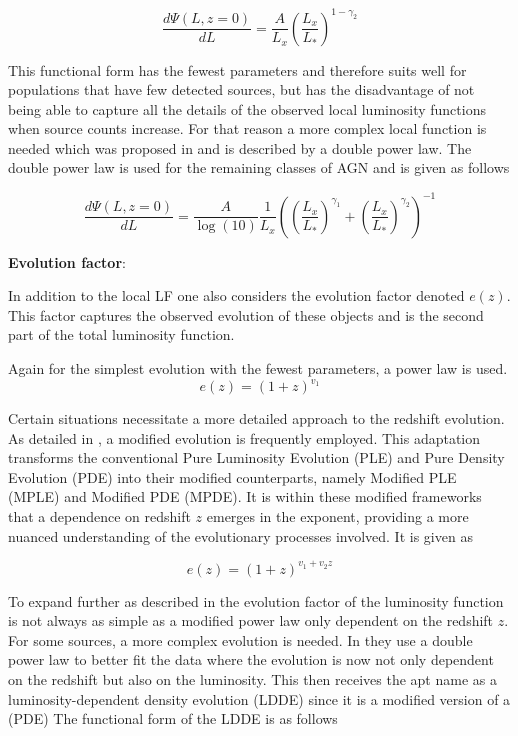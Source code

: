 \begin{equation}
    \frac{d\Psi(L,z=0)}{dL} = \frac{A}{L_x} \left( \frac{L_x}{L_*}\right)^{1-\gamma_2}
\end{equation}

This functional form has the fewest parameters and therefore suits well for populations that have few detected sources, but has the disadvantage of not being able to capture all the details of the observed local luminosity functions when source counts increase.
For that reason a more complex local function is needed which was proposed in \cite{Ueda_2003} and is described by a double power law.
The double power law is used for the remaining classes of AGN and is given as follows


   
\begin{equation}
    \frac{d\Psi(L,z=0)}{dL} =  \frac{A}{\log(10)} \frac{1}{L_x} \left( \left( \frac{L_x}{L_*} \right)^{\gamma_1} + \left( \frac{L_x}{L_*} \right)^{\gamma_2} \right)^{-1}
\end{equation}



\textbf{Evolution factor}:

In addition to the local LF one also considers the evolution factor denoted $e(z)$. This factor captures the observed evolution of these objects and is the second part of the total luminosity function.

Again for the simplest evolution with the fewest parameters, a power law is used.
 $$
e(z) = (1 + z)^{v_1 }
 $$


  
Certain situations necessitate a more detailed approach to the redshift evolution. 
 As detailed in \cite{Ajello_2009}, a modified evolution is frequently employed. 
 This adaptation transforms the conventional Pure Luminosity Evolution (PLE) and Pure Density Evolution 
 (PDE) into their modified counterparts, namely Modified PLE (MPLE) and Modified PDE (MPDE).
It is within these modified frameworks that a dependence on redshift $z$ emerges in the exponent,
providing a more nuanced understanding of the evolutionary processes involved. It is given as

$$
e(z) = (1 + z)^{v_1 +v_2 z }
$$



 To expand further as described in \cite{Silverman_2008} the evolution factor of the luminosity function is not always as simple as a modified power law only dependent on the redshift $z$.
For some sources, a more complex evolution is needed. In \cite{Silverman_2008} they use a double power law to better fit the data where 
 the evolution is now not only dependent on the redshift but also on the luminosity. This then receives the apt name as a luminosity-dependent density evolution (LDDE) since it is a modified version of a (PDE)
 The functional form of the LDDE is as follows


